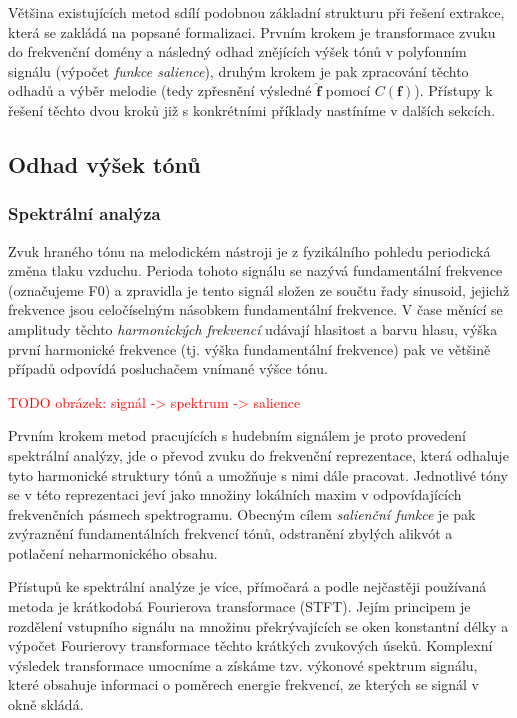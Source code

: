 Většina existujících metod sdílí podobnou základní strukturu při řešení extrakce, která se zakládá na popsané formalizaci. Prvním krokem je transformace zvuku do frekvenční domény a následný odhad znějících výšek tónů v polyfonním signálu (výpočet \textit{funkce salience}), druhým krokem je pak zpracování těchto odhadů a výběr melodie (tedy zpřesnění výsledné $\hat{\mathbf{f}}$ pomocí $C(\mathbf{f})$). Přístupy k řešení těchto dvou kroků již s konkrétními příklady nastíníme v dalších sekcích.

\subsection{Odhad výšek tónů}

\subsubsection{Spektrální analýza}

Zvuk hraného tónu na melodickém nástroji je z fyzikálního pohledu periodická změna tlaku vzduchu. Perioda tohoto signálu se nazývá fundamentální frekvence (označujeme F0) a zpravidla je tento signál složen ze součtu řady sinusoid, jejichž frekvence jsou celočíselným násobkem fundamentální frekvence. V čase měnící se amplitudy těchto \textit{harmonických frekvencí} udávají hlasitost a barvu hlasu, výška první harmonické frekvence (tj. výška fundamentální frekvence) pak ve většině případů odpovídá posluchačem vnímané výšce tónu. 

\textcolor{red}{TODO obrázek: signál -> spektrum -> salience}

Prvním krokem metod pracujících s hudebním signálem je proto provedení spektrální analýzy, jde o převod zvuku do frekvenční reprezentace, která odhaluje tyto harmonické struktury tónů a umožňuje s nimi dále pracovat. Jednotlivé tóny se v této reprezentaci jeví jako množiny lokálních maxim v odpovídajících frekvenčních pásmech spektrogramu. Obecným cílem \textit{salienční funkce} je pak zvýraznění fundamentálních frekvencí tónů, odstranění zbylých alikvót a potlačení neharmonického obsahu.


Přístupů ke spektrální analýze je více, přímočará a podle \cite{Dressler2016} nejčastěji používaná metoda je krátkodobá Fourierova transformace (STFT). Jejím principem je rozdělení vstupního signálu na množinu překrývajících se oken konstantní délky a výpočet Fourierovy transformace těchto krátkých zvukových úseků. Komplexní výsledek transformace umocníme a získáme tzv. výkonové spektrum signálu, které obsahuje informaci o poměrech energie frekvencí, ze kterých se signál v okně skládá. 


